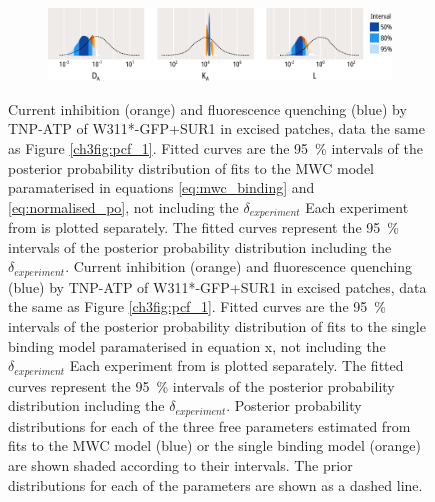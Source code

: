 \begin{figure}[h]
\begin{subfigure}[t]{0.45\textwidth}
	\end{subfigure}
	\vfill
	\begin{subfigure}[t]{0.9\textwidth}
		\caption{}\label{ch4fig:w311_mwc_fit_3}
		\centering
		\includegraphics[width=\textwidth]{w311_mwc_fit_3.pdf}
	\end{subfigure}
	\caption[A concerted model explains the data better than an independent model]{
	 Current inhibition (orange) and fluorescence quenching (blue) by TNP-ATP of W311*-GFP+SUR1 in excised patches, data the same as Figure \ref{ch3fig:pcf_1}.
	Fitted curves are the \SI{95}{\percent} intervals of the posterior probability distribution of fits to the MWC model paramaterised in equations \ref{eq:mwc_binding} and \ref{eq:normalised_po}, not including the $\delta_{experiment}$
	 Each experiment from  is plotted separately.
	The fitted curves represent the \SI{95}{\percent} intervals of the posterior probability distribution including the $\delta_{experiment}$.
	 Current inhibition (orange) and fluorescence quenching (blue) by TNP-ATP of W311*-GFP+SUR1 in excised patches, data the same as Figure \ref{ch3fig:pcf_1}.
	Fitted curves are the \SI{95}{\percent} intervals of the posterior probability distribution of fits to the single binding model paramaterised in equation x, not including the $\delta_{experiment}$
	 Each experiment from  is plotted separately.
	The fitted curves represent the \SI{95}{\percent} intervals of the posterior probability distribution including the $\delta_{experiment}$.
	 Posterior probability distributions for each of the three free parameters estimated from fits to the MWC model (blue) or the single binding model (orange) are shown shaded according to their intervals.
	The prior distributions for each of the parameters are shown as a dashed line.
	}\label{ch4fig:w311_model_comparison}
\end{figure}

